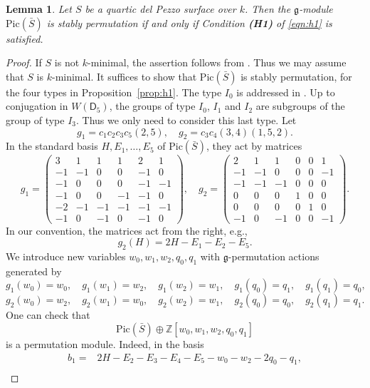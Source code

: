 \documentclass[12pt, reqno]{amsart}
\theoremstyle{plain}
\newtheorem{lemm}[prop]{Lemma}
\theoremstyle{remark}
\theoremstyle{definition}
\numberwithin{equation}{section}
\def\sD{{\mathsf D}}
\def\bZ{{\mathbb Z}}
\def\Pic{\mathrm{Pic}}
\begin{document}
\begin{lemm}\label{lemm:stablyperm}
    Let $S$ be a quartic del Pezzo surface over $k$. Then 
    the $\mathfrak g$-module 
    $\Pic(\bar{S})$ is stably permutation if and only if Condition {\bf (H1)} of  \eqref{eqn:h1} is satisfied.
\end{lemm}
   \begin{proof}
      If $S$ is not $k$-minimal, the assertion follows from 
      \cite{manin-book}. Thus we may assume that $S$ is $k$-minimal. It suffices to show that $\Pic(\bar{S})$ is stably permutation, for the four types in Proposition~\ref{prop:h1}. The type $I_0$ is addressed in \cite{bctspstably}. Up to conjugation in $W(\sD_5)$, the groups of type $I_0$, $I_1$ and $I_2$ are subgroups of the group of type $I_3$. Thus we only need to consider this last type. 
      Let 
      $$
      g_1=c_1c_2c_3c_5(2,5), \quad g_2=c_3c_4(3,4)(1,5,2).
      $$
      In the standard basis $H, E_1,\ldots,E_5$ of  $\Pic(\bar{S})$, they act by matrices
{\small
$$
g_1=
\begin{pmatrix}
 3& 1& 1& 1& 2& 1\\
-1&-1& 0& 0&-1& 0\\
-1& 0& 0& 0&-1&-1\\
-1& 0& 0&-1&-1& 0\\
-2&-1&-1&-1&-1&-1\\
-1& 0&-1& 0&-1& 0
\end{pmatrix},
\quad
g_2=
\begin{pmatrix}
 2& 1& 1& 0& 0& 1\\
-1&-1& 0& 0& 0&-1\\
-1&-1&-1& 0& 0& 0\\
 0& 0& 0& 1& 0& 0\\
 0& 0& 0& 0& 1& 0\\
-1& 0&-1& 0& 0&-1
\end{pmatrix}.
$$}
In our convention, the matrices act from the right, e.g.,  
$$
g_2(H)=2H-E_1-E_2-E_5.
$$
We introduce new variables $w_0,w_1,w_2,q_0,q_1$ with $\mathfrak g$-permutation actions generated by 
$$
g_1(w_0)=w_0,\quad g_1(w_1)=w_2,\quad g_1(w_2)=w_1,\quad g_1(q_0)=q_1,\quad g_1(q_1)=q_0,
$$
$$
g_2(w_0)=w_2,\quad g_2(w_1)=w_0,\quad g_2(w_2)=w_1,\quad g_2(q_0)=q_0,\quad g_2(q_1)=q_1.
$$
One can check that 
$$
\Pic(\bar{S})\oplus\bZ[w_0,w_1,w_2,q_0,q_1]
$$ 
is a permutation module. Indeed, in the basis
\begin{align*}
b_1={}&
  2H-E_2-E_3-E_4-E_5-w_0-w_2-2q_0-q_1,\\

\end{align*}
\end{proof}
\end{document}
